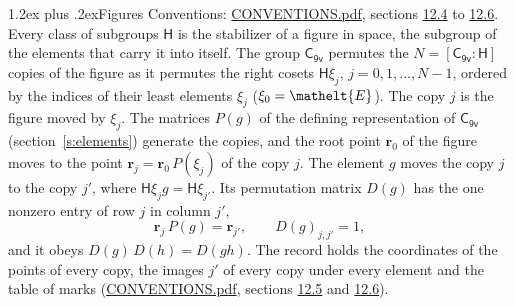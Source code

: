 \documentclass[10pt,a4paper]{article}
\makeatletter
\renewcommand\section{\@startsection{section}{1}{\z@}{-3ex plus -1ex minus -.2ex}%
  {1.2ex plus .2ex}{\normalfont\large\sffamily\bfseries\color{parttitle}}}
\numberwithin{equation}{section}
\newcommand{\eltfont}[1]{{\let\sigma\eltsigma\mathelt{#1}}}
\newcommand{\grp}[1]{\mathsf{#1}}
\newcommand{\cls}[1]{\eltfont{#1}}
\newcommand{\pointr}{\mathbf{r}}
\makeatother
\begin{document}
\section{Figures}\label{s:permutation}
Conventions: \href{../../CONVENTIONS.pdf}{CONVENTIONS.pdf}, sections \href{../../CONVENTIONS.pdf\#conv.12.4}{12.4} to \href{../../CONVENTIONS.pdf\#conv.12.6}{12.6}.
Every class of subgroups $\grp{H}$ is the stabilizer of a figure in space, the subgroup of the elements that carry it into itself. \label{n:local.orbit.size}\label{n:element.coset.least}\label{n:index.coset}The group $\grp{C_{9v}}$ permutes the $N = [\grp{C_{9v}} : \grp{H}]$ copies of the figure as it permutes the right cosets $\grp{H}\xi_j$, $j = 0, 1, \dots, N - 1$, ordered by the indices of their least elements $\xi_j$ ($\xi_0 = \cls{E}$). The copy $j$ is the figure moved by $\xi_j$. The matrices $P(g)$ of the defining representation of $\grp{C_{9v}}$ (section~\ref{s:elements}) generate the copies, and the root point $\pointr_0$ of the figure moves to the point $\pointr_j = \pointr_0\, P(\xi_j)$ of the copy $j$. \label{n:local.coset.image}The element $g$ moves the copy $j$ to the copy $j'$, where $\grp{H}\xi_j g = \grp{H}\xi_{j'}$. \label{n:local.matrix.permutation}Its permutation matrix $D(g)$ has the one nonzero entry of row $j$ in column $j'$,
\begin{equation}\label{e:perm.matrix}\pointr_j\, P(g) = \pointr_{j'}, \qquad D(g)_{j,j'} = 1,\end{equation}
and it obeys $D(g)\, D(h) = D(gh)$. The record holds the coordinates of the points of every copy, the images $j'$ of every copy under every element and the table of marks (\href{../../CONVENTIONS.pdf}{CONVENTIONS.pdf}, sections \href{../../CONVENTIONS.pdf\#conv.12.5}{12.5} and \href{../../CONVENTIONS.pdf\#conv.12.6}{12.6}).
\end{document}
